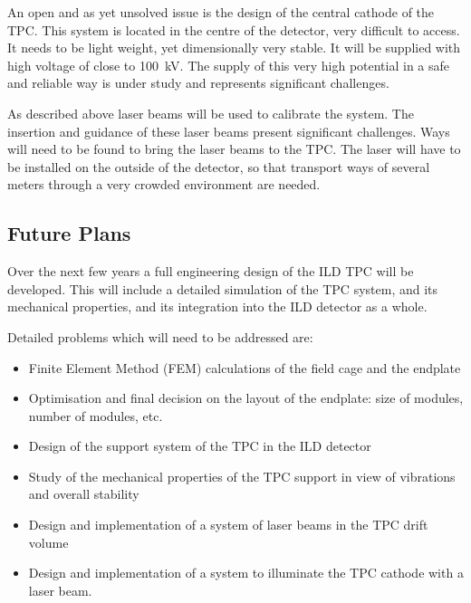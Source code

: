 An open and as yet unsolved issue is the design of the central cathode of the TPC. This system is located in the centre of the detector, very difficult to access. It needs to be light weight, yet dimensionally very stable. It will be supplied with high voltage of close to \SI{100}{kV}. The supply of this very high potential in a safe and reliable way is under study and represents significant challenges.

As described above laser beams will be used to calibrate the system. The insertion and guidance of these laser beams present significant challenges. Ways will need to be found to bring the laser beams to the TPC. The laser will have to be installed on the outside of the detector, so that transport ways of several meters through a very crowded environment are needed.

\subsection{Future Plans}
Over the next few years a full engineering design of the ILD TPC will be developed. This will include a detailed simulation of the TPC system, and its mechanical properties, and its integration into the ILD detector as a whole.

Detailed problems which will need to be addressed are:

\begin{itemize}
\item Finite Element Method (FEM) calculations of the field cage and the endplate
\item Optimisation and final decision on the layout of the endplate: size of modules, number of modules, etc.
\item Design of the support system of the TPC in the ILD detector
\item Study of the mechanical properties of the TPC support in view of vibrations and overall stability
\item Design and implementation of a system of laser beams in the TPC drift volume
\item Design and implementation of a system to illuminate the TPC cathode with a laser beam.
\end{itemize}



